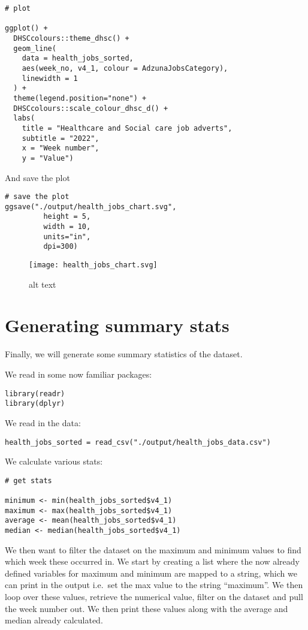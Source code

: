 \documentclass[
]{book}
\begin{document}
\begin{verbatim}
# plot

ggplot() +
  DHSCcolours::theme_dhsc() +
  geom_line(
    data = health_jobs_sorted,
    aes(week_no, v4_1, colour = AdzunaJobsCategory),
    linewidth = 1
  ) +
  theme(legend.position="none") +
  DHSCcolours::scale_colour_dhsc_d() +
  labs(
    title = "Healthcare and Social care job adverts",
    subtitle = "2022",
    x = "Week number",
    y = "Value")
\end{verbatim}

And save the plot

\begin{verbatim}
# save the plot
ggsave("./output/health_jobs_chart.svg",
         height = 5,
         width = 10,
         units="in",
         dpi=300)
\end{verbatim}

\begin{figure}
\centering
\texttt{[image: health\_jobs\_chart.svg]}
\caption{alt text}
\end{figure}

\hypertarget{generating-summary-stats}{%
\section{Generating summary stats}\label{generating-summary-stats}}

Finally, we will generate some summary statistics of the dataset.

We read in some now familiar packages:

\begin{verbatim}
library(readr)
library(dplyr)
\end{verbatim}

We read in the data:

\begin{verbatim}
health_jobs_sorted = read_csv("./output/health_jobs_data.csv")
\end{verbatim}

We calculate various stats:

\begin{verbatim}
# get stats

minimum <- min(health_jobs_sorted$v4_1)
maximum <- max(health_jobs_sorted$v4_1)
average <- mean(health_jobs_sorted$v4_1)
median <- median(health_jobs_sorted$v4_1)
\end{verbatim}

We then want to filter the dataset on the maximum and minimum values to find which week these occurred in. We start by creating a list where the now already defined variables for maximum and minimum are mapped to a string, which we can print in the output i.e.~set the max value to the string ``maximum''. We then loop over these values, retrieve the numerical value, filter on the dataset and pull the week number out. We then print these values along with the average and median already calculated.
\end{document}
